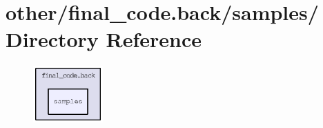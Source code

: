 \section{other/final\_\-code.back/samples/ Directory Reference}
\label{dir_e83b7a7431a38e4d3d1afd52a7979c59}


\begin{figure}[H]
\begin{center}
\leavevmode
\includegraphics[width=76pt]{dir_e83b7a7431a38e4d3d1afd52a7979c59_dep}
\end{center}
\end{figure}
